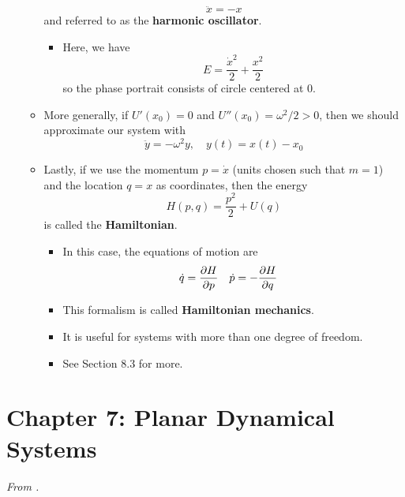\documentclass[../notes.tex]{subfiles}
\begin{document}
\begin{itemize}
\begin{itemize}
        \begin{equation*}
            \ddot{x} = -x
        \end{equation*}
        and referred to as the \textbf{harmonic oscillator}.
        \begin{itemize}
            \item Here, we have
            \begin{equation*}
                E = \frac{\dot{x}^2}{2}+\frac{x^2}{2}
            \end{equation*}
            so the phase portrait consists of circle centered at 0.
        \end{itemize}
        \item More generally, if $U'(x_0)=0$ and $U''(x_0)=\omega^2/2>0$, then we should approximate our system with
        \begin{equation*}
            \ddot{y} = -\omega^2y
            ,\quad
            y(t) = x(t)-x_0
        \end{equation*}
        \item Lastly, if we use the momentum $p=\dot{x}$ (units chosen such that $m=1$) and the location $q=x$ as coordinates, then the energy
        \begin{equation*}
            H(p,q) = \frac{p^2}{2}+U(q)
        \end{equation*}
        is called the \textbf{Hamiltonian}.
        \begin{itemize}
            \item In this case, the equations of motion are
            \begin{align*}
                \dot{q} &= \pdv{H}{p}&
                \dot{p} &= -\pdv{H}{q}
            \end{align*}
            \item This formalism is called \textbf{Hamiltonian mechanics}.
            \item It is useful for systems with more than one degree of freedom.
            \item See Section 8.3 for more.
        \end{itemize}
    \end{itemize}
\end{itemize}



\section{Chapter 7: Planar Dynamical Systems}
\emph{From \textcite{bib:Teschl}.}
\end{document}
